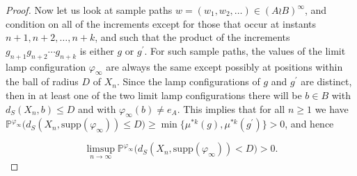 \documentclass[reqno,oneside,11pt]{amsart}
\renewcommand{\P}{\mathbb{P}}
\newcommand{\supp}[1]{\mathrm{supp}(#1)}
\theoremstyle{plain}
\theoremstyle{definition}
\begin{document}
\begin{proof}
		
		Now let us look at sample paths $w=(w_1,w_2,\ldots) \in (A\wr B)^{\infty}$, and condition on all of the increments except for those that occur at instants $n+1,n+2,\ldots,n+k$, and such that the product of the increments $g_{n+1}g_{n+2}\cdots g_{n+k}$ is either $g$ or $g^{\prime}$. For such sample paths, the values of the limit lamp configuration $\varphi_{\infty}$ are always the same except possibly at positions within the ball of radius $D$ of $X_n$. Since the lamp configurations of $g$ and $g^{\prime}$ are distinct, then in at least one of the two limit lamp configurations there will be $b\in B$ with $d_S(X_n,b)\le D$ and with $\varphi_{\infty}(b)\neq e_A$. This implies that for all $n\ge 1$ we have $	\P^{\varphi_{\infty}}\Big(d_S(X_n,\supp{\varphi_{\infty}})\le D\Big)\ge \min\{ \mu^{*k}(g),\mu^{*k}(g^{\prime}) \}>0 $, and hence
	
	\begin{equation}\label{eq: Xn is close to a lit lamp} \limsup_{n\to \infty}\P^{\varphi_{\infty}}\Big(d_S(X_n,\supp{\varphi_{\infty}})<D\Big) >0.
		\end{equation}

	
%	
%	
%	
	

\end{proof}
\end{document}
